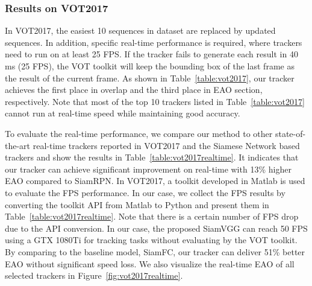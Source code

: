 \documentclass[runningheads]{llncs}
\begin{document}
\subsubsection{Results on VOT2017}

In VOT2017, the easiest 10 sequences in dataset are replaced by updated sequences. In addition, specific real-time performance is required, where trackers need to run on at least 25 FPS. If the tracker fails to generate each result in 40 ms (25 FPS), the VOT toolkit will keep the bounding box of the last frame as the result of the current frame. As shown in Table~\ref{table:vot2017}, our tracker achieves the first place in overlap and the third place in EAO section, respectively. Note that most of the top 10 trackers listed in Table~\ref{table:vot2017} cannot run at real-time speed while maintaining good accuracy.

To evaluate the real-time performance, we compare our method to other state-of-the-art real-time trackers reported in VOT2017 and the Siamese Network based trackers and show the results in Table~\ref{table:vot2017realtime}. It indicates that our tracker can achieve significant improvement on real-time with 13\% higher EAO compared to SiamRPN. 
In VOT2017, a toolkit developed in Matlab is used to evaluate the FPS performance. In our case, we collect the FPS results by converting the toolkit API from Matlab to Python and present them in Table~\ref{table:vot2017realtime}. Note that there is a certain number of FPS drop due to the API conversion. 
In our case, the proposed SiamVGG can reach 50 FPS using a GTX 1080Ti for tracking tasks without evaluating by the VOT toolkit. By comparing to the baseline model, SiamFC, our tracker can deliver 51\% better EAO without significant speed loss.
We also visualize the real-time EAO of all selected trackers in Figure~\ref{fig:vot2017realtime}. 
\end{document}
